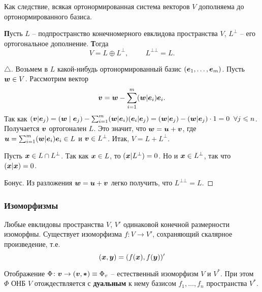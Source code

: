 Как следствие, всякая ортонормированная система векторов $V$ дополняема до ортонормированного базиса.


\begin{to_thr}
    \textbf{П}усть $L$ -- подпространство конечномерного евклидова пространства $V$, $L^{\bot}$ -- его ортогональное дополнение. \textbf{Т}огда 
    \begin{equation}
        V = L \oplus L^{\bot}, \hspace{1cm} L^{\bot \bot} = L.
    \end{equation}
\end{to_thr}

\begin{proof}[$\triangle$]
    Возьмем в $L$ какой-нибудь ортонормированный базис $(\mbox{\boldmath $e$}_{1}, \ldots, \mbox{\boldmath $e$}_m)$. Пусть $\mbox{\boldmath $w$} \in V$. Рассмотрим вектор
    $$
        \mbox{\boldmath $v$} = \mbox{\boldmath $w$} - \sum_{i=1}^m (\mbox{\boldmath $w$} | \mbox{\boldmath $e$}_i) \mbox{\boldmath $e$}_i.
    $$
    Так как $(\mbox{\boldmath $v$} | \mbox{\boldmath $e$}_j) = (\mbox{\boldmath $w$} \mid \mbox{\boldmath $e$}_j) - \sum_{i=1}^{m} (\mbox{\boldmath $w$} | \mbox{\boldmath $e$}_i) (\mbox{\boldmath $e$}_i | \mbox{\boldmath $e$}_j) = (\mbox{\boldmath $w$} | \mbox{\boldmath $e$}_j)  - (\mbox{\boldmath $w$} | \mbox{\boldmath $e$}_j) \cdot 1 = 0\; \; \forall j \leqslant n$. Получается $\mbox{\boldmath $v$}$ ортогонален $L$. Это значит, что $\mbox{\boldmath $w$} = \mbox{\boldmath $u$} + \mbox{\boldmath $v$}$, где $\mbox{\boldmath $u$} = \sum_{i=1}^{m} (\mbox{\boldmath $w$} | \mbox{\boldmath $e$}_i) \mbox{\boldmath $e$}_i \in L$ и $\mbox{\boldmath $v$} \in L^{\bot}$. Итак, $V = L + L^{\bot}$. 

    Пусть $\mbox{\boldmath $x$} \in L \cap L^{\bot}$. Так как $\mbox{\boldmath $x$} \in L$, то $(\mbox{\boldmath $x$} | L^{\bot})=0$. Но и $\mbox{\boldmath $x$} \in L^{\bot}$, так что $(\mbox{\boldmath $x$} | \mbox{\boldmath $x$}) = 0$.

    Бонус. Из разложения $\mbox{\boldmath $w$} = \mbox{\boldmath $u$} + \mbox{\boldmath $v$}$ легко получить, что $L^{\bot \bot} = L$. 
\end{proof}

\subsubsection{\xmark Изоморфизмы}

\begin{to_thr}
    Любые евклидовы пространства $V$, $V'$ одинаковой конечной размерности изоморфны. Существует изоморфизма $f \colon V \to V'$, сохраняющий скалярное произведение, т.е.
    \begin{equation}
        (\mbox{\boldmath $x$}, \mbox{\boldmath $y$}) = (f(\mbox{\boldmath $x$}), f(\mbox{\boldmath $y$}))'
    \end{equation}
\end{to_thr}

\begin{to_thr}
    Отображение $\Phi \colon \mbox{\boldmath $v$} \to (\mbox{\boldmath $v$}, \mbox{\boldmath $*$}) \equiv \Phi_{v}$ -- естественный изоморфизм $V$ и $V^{*}$. При этом $\Phi$ ОНБ $V$ отождествляется с \textbf{дуальным} к нему базисом $f_1, \dots, f_n$ пространства $V^*$. 
\end{to_thr}



